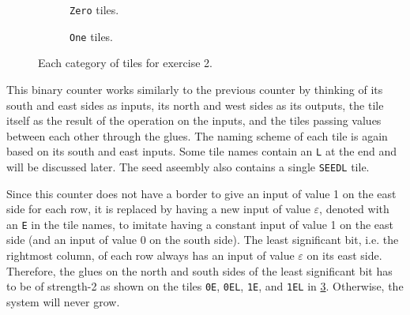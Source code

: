 \documentclass[11pt]{article}
\begin{document}
\begin{figure}[htbp]
    \centering
    \begin{subfigure}{\textwidth}
        \centering
        
        
        
        
        
        
        \caption{\texttt{Zero} tiles.}
        \label{fig:exs-2_zero}
    \end{subfigure}
    \begin{subfigure}{\textwidth}
        \centering
        
        
        
        
        
        
        \caption{\texttt{One} tiles.}
        \label{fig:exs-2_one}
    \end{subfigure}
    \caption{Each category of tiles for exercise 2.}
    \label{fig:exs-2}
\end{figure}

This binary counter works similarly to the previous counter by thinking of its south and east sides
as inputs, its north and west sides as its outputs, the tile itself as the result of the operation
on the inputs, and the tiles passing values between each other through the glues. The naming scheme
of each tile is again based on its south and east inputs. Some tile names contain an \verb|L| at the
end and will be discussed later. The seed aseembly also contains a single \verb|SEEDL| tile.

Since this counter does not have a border to give an input of value 1 on the east side for each row,
it is replaced by having a new input of value $\varepsilon$, denoted with an \verb|E| in the tile
names, to imitate having a constant input of value 1 on the east side (and an input of value 0 on
the south side). The least significant bit, i.e. the rightmost column, of each row always has
an input of value $\varepsilon$ on its east side. Therefore, the glues on the north and south sides
of the least significant bit has to be of strength-2 as shown on the tiles \verb|0E|, \verb|0EL|,
\verb|1E|, and \verb|1EL| in \cref{fig:exs-2}. Otherwise, the system will never grow.
\end{document}
